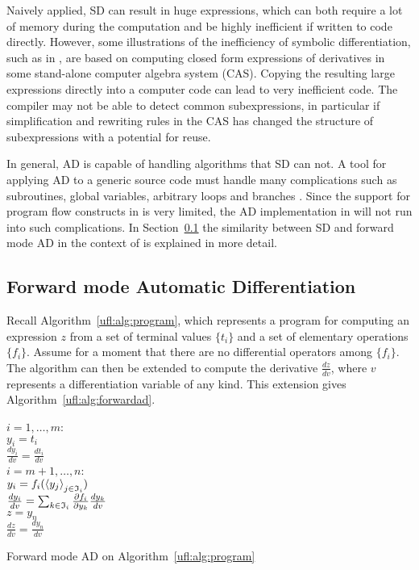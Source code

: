Naively applied, SD can result in huge expressions, which can both
require a lot of memory during the computation and be highly
inefficient if written to code directly. However, some illustrations
of the inefficiency of symbolic differentiation, such as
in \citet{Griewank1989}, are based on computing closed form expressions of
derivatives in some stand-alone computer algebra system (CAS).
Copying the resulting large expressions directly into a computer code
can lead to very inefficient code. The compiler may not be able to
detect common subexpressions, in particular if simplification and
rewriting rules in the CAS has changed the structure of subexpressions
with a potential for reuse.

In general, AD is capable of handling algorithms that SD can not.  A tool
for applying AD to a generic source code must handle many complications
such as subroutines, global variables, arbitrary loops and branches
\citep{BischofCarleCorlissEtAl1992,BischofHovlandNorris2002,GieringKaminski1998}.
Since the support for program flow constructs in \ufl{} is very limited,
the AD implementation in \ufl{} will not run into such complications.
In Section~\ref{ufl:sec:forwardad} the similarity between SD and forward
mode AD in the context of \ufl{} is explained in more detail.

\subsection{Forward mode Automatic Differentiation}
\label{ufl:sec:forwardad}

Recall Algorithm~\ref{ufl:alg:program}, which represents a program for
computing an expression $z$ from a set of terminal values $\{ t_i \}$
and a set of elementary operations $\{ f_i \}$. Assume for a moment
that there are no differential operators among $\{ f_i \}$.  The
algorithm can then be extended to compute the derivative $\frac{d z}{d
  v}$, where $v$ represents a differentiation variable of any kind.
This extension gives Algorithm~\ref{ufl:alg:forwardad}.

\begin{algorithm}
\afor $i = 1, \ldots, m$:\\
\tab $y_i = t_i$ \\
\tab $\frac{d y_i}{d v} = \frac{d t_i}{d v}$ \\
\afor $i = m+1, \ldots, n$:\\
\tab $y_i = f_i(\left\langle{y_j}\right\rangle_{j\in\mathfrak{I}_i})$ \\
\tab $\frac{d y_i}{d v} = \sum_{k\in\mathfrak{I}_i} \frac{\partial f_i}{\partial y_k} \frac{d y_k}{d v}$ \\
$z = y_n$ \\
$\frac{d z}{d v} = \frac{d y_n}{d v}$
\caption{Forward mode AD on Algorithm~\ref{ufl:alg:program}}
\label{ufl:alg:forwardad}
\end{algorithm}

